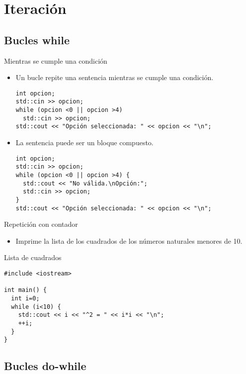 \section{Iteración}

\subsection{Bucles \textbf{while}}

\begin{frame}[t,fragile]{Mientras se cumple una condición}
\begin{itemize}
  \item Un bucle  repite una sentencia mientras
        se cumple una condición.
\begin{lstlisting}
int opcion;
std::cin >> opcion;
while (opcion <0 || opcion >4)
  std::cin >> opcion;
std::cout << "Opción seleccionada: " << opcion << "\n";
\end{lstlisting}

  \item La sentencia puede ser un bloque compuesto.
\begin{lstlisting}
int opcion;
std::cin >> opcion;
while (opcion <0 || opcion >4) {
  std::cout << "No válida.\nOpción:";
  std::cin >> opcion;
}
std::cout << "Opción seleccionada: " << opcion << "\n";
\end{lstlisting}
\end{itemize}
\end{frame}

\begin{frame}[t,fragile]{Repetición con contador}
\begin{itemize}
  \item Imprime la lista de los cuadrados de los números naturales
        menores de 10.
\end{itemize}
\begin{block}{Lista de cuadrados}
\begin{lstlisting}
#include <iostream>

int main() {
  int i=0;
  while (i<10) {
    std::cout << i << "^2 = " << i*i << "\n";
    ++i;
  }
}
\end{lstlisting}
\end{block}
\end{frame}

\subsection{Bucles \textbf{do-while}}

